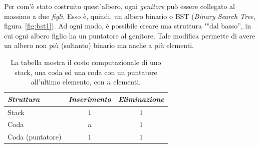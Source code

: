
Per com'è stato costruito quest'albero, ogni {\em genitore} può essere collegato al massimo a due \emph{figli}. Esso è, quindi, un albero binario o BST (\emph{Binary Search Tree}, figura~\vref{fig:bst1}). Ad ogni modo, è possibile creare una struttura ""dal basso'', in cui ogni albero figlio ha un puntatore al genitore. Tale modifica permette di avere un albero non più (soltanto) binario ma anche a più elementi.

\begin{table}
	\centering
	\caption[Costo computazionale]{La tabella mostra il costo computazionale di uno stack, una coda ed una coda con un puntatore all'ultimo elemento, con $n$ elementi.}
	\label{tab:co-st}
	\begin{tabular}{l | c c}
		\toprule
\emph{Struttura}		&\emph{Inserimento}	&\emph{Eliminazione}	\\
		\midrule
	Stack			&$1$				&$1$				\\
	Coda			&$n$				&$1$				\\
	Coda (puntatore)	&$1$				&$1$
	\end{tabular}
\end{table}

